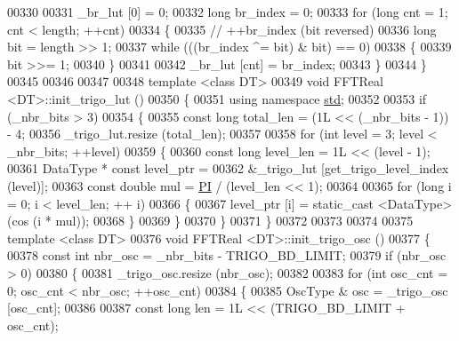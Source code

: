 \begin{DoxyCode}
00330 
00331     \_br\_lut [0] = 0;
00332     \textcolor{keywordtype}{long}                br\_index = 0;
00333     \textcolor{keywordflow}{for} (\textcolor{keywordtype}{long} cnt = 1; cnt < length; ++cnt)
00334     \{
00335         \textcolor{comment}{// ++br\_index (bit reversed)}
00336         \textcolor{keywordtype}{long}                bit = length >> 1;
00337         \textcolor{keywordflow}{while} (((br\_index ^= bit) & bit) == 0)
00338         \{
00339             bit >>= 1;
00340         \}
00341 
00342         \_br\_lut [cnt] = br\_index;
00343     \}
00344 \}
00345 
00346 
00347 
00348 \textcolor{keyword}{template} <\textcolor{keyword}{class} DT>
00349 \textcolor{keywordtype}{void}    FFTReal <DT>::init\_trigo\_lut ()
00350 \{
00351     \textcolor{keyword}{using namespace }\hyperlink{a00144}{std};
00352 
00353     \textcolor{keywordflow}{if} (\_nbr\_bits > 3)
00354     \{
00355         \textcolor{keyword}{const} \textcolor{keywordtype}{long}      total\_len = (1L << (\_nbr\_bits - 1)) - 4;
00356         \_trigo\_lut.resize (total\_len);
00357 
00358         \textcolor{keywordflow}{for} (\textcolor{keywordtype}{int} level = 3; level < \_nbr\_bits; ++level)
00359         \{
00360             \textcolor{keyword}{const} \textcolor{keywordtype}{long}      level\_len = 1L << (level - 1);
00361             DataType    * \textcolor{keyword}{const} level\_ptr =
00362                 &\_trigo\_lut [get\_trigo\_level\_index (level)];
00363             \textcolor{keyword}{const} \textcolor{keywordtype}{double}    mul = \hyperlink{a00142_a74ffcd4c90202b5240bbca7374dfd6fa}{PI} / (level\_len << 1);
00364 
00365             \textcolor{keywordflow}{for} (\textcolor{keywordtype}{long} i = 0; i < level\_len; ++ i)
00366             \{
00367                 level\_ptr [i] = static\_cast <DataType> (cos (i * mul));
00368             \}
00369         \}
00370     \}
00371 \}
00372 
00373 
00374 
00375 \textcolor{keyword}{template} <\textcolor{keyword}{class} DT>
00376 \textcolor{keywordtype}{void}    FFTReal <DT>::init\_trigo\_osc ()
00377 \{
00378     \textcolor{keyword}{const} \textcolor{keywordtype}{int}       nbr\_osc = \_nbr\_bits - TRIGO\_BD\_LIMIT;
00379     \textcolor{keywordflow}{if} (nbr\_osc > 0)
00380     \{
00381         \_trigo\_osc.resize (nbr\_osc);
00382 
00383         \textcolor{keywordflow}{for} (\textcolor{keywordtype}{int} osc\_cnt = 0; osc\_cnt < nbr\_osc; ++osc\_cnt)
00384         \{
00385             OscType &       osc = \_trigo\_osc [osc\_cnt];
00386 
00387             \textcolor{keyword}{const} \textcolor{keywordtype}{long}      len = 1L << (TRIGO\_BD\_LIMIT + osc\_cnt);

\end{DoxyCode}
